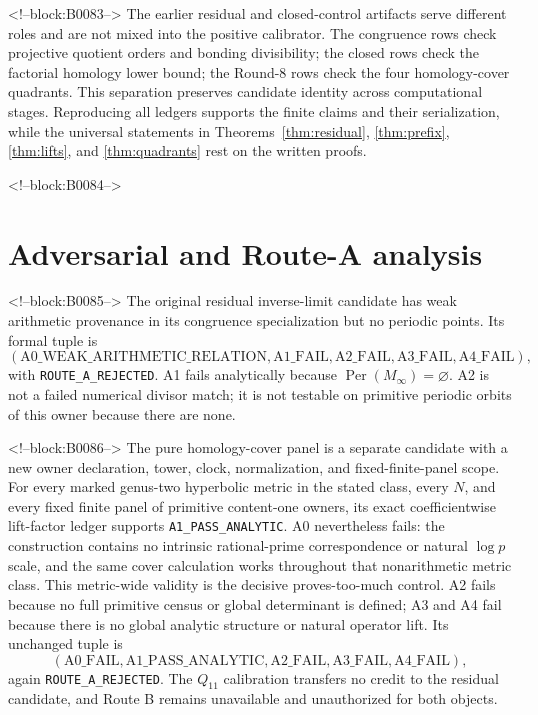 \documentclass[11pt]{article}
\theoremstyle{definition}
\theoremstyle{remark}
\newcommand{\Per}{\operatorname{Per}}
\begin{document}
<!--block:B0083-->
The earlier residual and closed-control artifacts serve different roles and are not mixed into the positive calibrator. The congruence rows check projective quotient orders and bonding divisibility; the closed rows check the factorial homology lower bound; the Round-8 rows check the four homology-cover quadrants. This separation preserves candidate identity across computational stages. Reproducing all ledgers supports the finite claims and their serialization, while the universal statements in Theorems~\ref{thm:residual}, \ref{thm:prefix}, \ref{thm:lifts}, and \ref{thm:quadrants} rest on the written proofs.

<!--block:B0084-->
\section{Adversarial and Route-A analysis}

<!--block:B0085-->
The original residual inverse-limit candidate has weak arithmetic provenance in its congruence specialization but no periodic points. Its formal tuple is
\[
(\mathrm{A0\_WEAK\_ARITHMETIC\_RELATION},
\mathrm{A1\_FAIL},\mathrm{A2\_FAIL},\mathrm{A3\_FAIL},\mathrm{A4\_FAIL}),
\]
with \texttt{ROUTE\_A\_REJECTED}. A1 fails analytically because $\Per(M_\infty)=\varnothing$. A2 is not a failed numerical divisor match; it is not testable on primitive periodic orbits of this owner because there are none.

<!--block:B0086-->
The pure homology-cover panel is a separate candidate with a new owner declaration, tower, clock, normalization, and fixed-finite-panel scope. For every marked genus-two hyperbolic metric in the stated class, every $N$, and every fixed finite panel of primitive content-one owners, its exact coefficientwise lift-factor ledger supports \texttt{A1\_PASS\_ANALYTIC}. A0 nevertheless fails: the construction contains no intrinsic rational-prime correspondence or natural $\log p$ scale, and the same cover calculation works throughout that nonarithmetic metric class. This metric-wide validity is the decisive proves-too-much control. A2 fails because no full primitive census or global determinant is defined; A3 and A4 fail because there is no global analytic structure or natural operator lift. Its unchanged tuple is
\[
(\mathrm{A0\_FAIL},\mathrm{A1\_PASS\_ANALYTIC},
\mathrm{A2\_FAIL},\mathrm{A3\_FAIL},\mathrm{A4\_FAIL}),
\]
again \texttt{ROUTE\_A\_REJECTED}. The $Q_{11}$ calibration transfers no credit to the residual candidate, and Route B remains unavailable and unauthorized for both objects.
\end{document}
